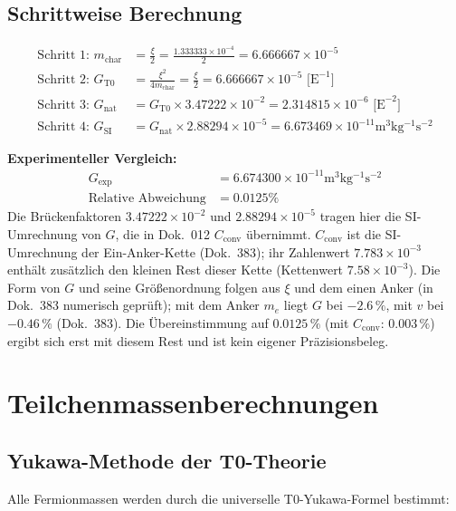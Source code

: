 	\subsection{Schrittweise Berechnung}
	
	\begin{align}
		\text{Schritt 1: } m_{\text{char}} &= \frac{\xi}{2} = \frac{1.333333 \times 10^{-4}}{2} = 6.666667 \times 10^{-5} \\
		\text{Schritt 2: } G_{\text{T0}} &= \frac{\xi^2}{4m_{\text{char}}} = \frac{\xi}{2} = 6.666667 \times 10^{-5} \text{ [E}^{-1}\text{]} \\
		\text{Schritt 3: } G_{\text{nat}} &= G_{\text{T0}} \times 3.47222 \times 10^{-2} = 2.314815 \times 10^{-6} \text{ [E}^{-2}\text{]} \\
		\text{Schritt 4: } G_{\text{SI}} &= G_{\text{nat}} \times 2.88294 \times 10^{-5} = 6.673469 \times 10^{-11} \si{\meter^3 \kilogram^{-1} \second^{-2}}
	\end{align}
	
	\textbf{Experimenteller Vergleich:}
	\begin{align}
		G_{\text{exp}} &= 6.674300 \times 10^{-11} \si{\meter^3 \kilogram^{-1} \second^{-2}} \\
		\text{Relative Abweichung} &= 0.0125\%
	\end{align}
		Die Brückenfaktoren $3.47222\times10^{-2}$ und $2.88294\times10^{-5}$ tragen hier die SI-Umrechnung von $G$, die in Dok.~012 $C_{\text{conv}}$ übernimmt. $C_{\text{conv}}$ ist die SI-Umrechnung der Ein-Anker-Kette (Dok.~383); ihr Zahlenwert $7.783\times10^{-3}$ enthält zusätzlich den kleinen Rest dieser Kette (Kettenwert $7.58\times10^{-3}$). Die Form von $G$ und seine Größenordnung folgen aus $\xi$ und dem einen Anker (in Dok.~383 numerisch geprüft); mit dem Anker $m_e$ liegt $G$ bei $-2.6\,\%$, mit $v$ bei $-0.46\,\%$ (Dok.~383). Die Übereinstimmung auf $0.0125\,\%$ (mit $C_{\text{conv}}$: $0.003\,\%$) ergibt sich erst mit diesem Rest und ist kein eigener Präzisionsbeleg.
	
	\section{Teilchenmassenberechnungen}
	
	\subsection{Yukawa-Methode der T0-Theorie}
	
	Alle Fermionmassen werden durch die universelle T0-Yukawa-Formel bestimmt:
	
